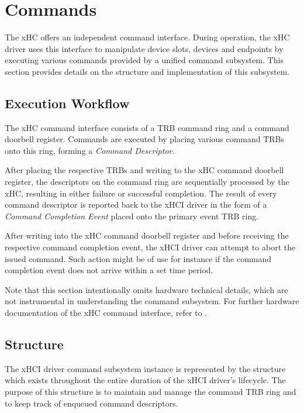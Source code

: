 \section{Commands}
\label{sec:commands}

The xHC offers an independent command interface. During operation, the xHC
driver uses this interface to manipulate device slots, devices and endpoints by
executing various commands provided by a unified command subsystem. This
section provides details on the structure and implementation of this subsystem.


\subsection{Execution Workflow}

The xHC command interface consists of a TRB command ring and a command doorbell
register. Commands are executed by placing various command TRBs onto this ring,
forming a \textit{Command Descriptor}.

After placing the respective TRBs and writing to the xHC command doorbell
register, the descriptors on the command ring are sequentially processed by the
xHC, resulting in either failure or successful completion. The result of every
command descriptor is reported back to the xHCI driver in the form of a
\textit{Command Completion Event} placed onto the primary event TRB ring.

After writing into the xHC command doorbell register and before receiving the
respective command completion event, the xHCI driver can attempt to abort the
issued command. Such action might be of use for instance if the command
completion event does not arrive within a set time period.

Note that this section intentionally omits hardware technical details, which are
not instrumental in understanding the command subsystem. For further hardware
documentation of the xHC command interface, refer to .


\subsection{Structure}

The xHCI driver command subsystem instance is represented by the
 structure which exists throughout the entire duration
of the xHCI driver's lifecycle. The purpose of this structure is to maintain and
manage the command TRB ring and to keep track of enqueued command descriptors.

